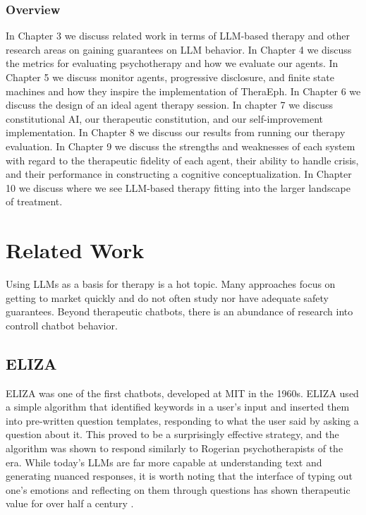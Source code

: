 \documentclass[twoside]{report}
\begin{document}
\subsection{Overview}
In Chapter 3 we discuss related work in terms of LLM-based therapy and other research areas on gaining guarantees on LLM behavior. In Chapter 4 we discuss the metrics for evaluating psychotherapy and how we evaluate our agents. In Chapter 5 we discuss monitor agents, progressive disclosure, and finite state machines and how they inspire the implementation of TheraEph. In Chapter 6 we discuss the design of an ideal agent therapy session. In chapter 7 we discuss constitutional AI, our therapeutic constitution, and our self-improvement implementation. In Chapter 8 we discuss our results from running our therapy evaluation. In Chapter 9 we discuss the strengths and weaknesses of each system with regard to the therapeutic fidelity of each agent, their ability to handle crisis, and their performance in constructing a cognitive conceptualization. In Chapter 10 we discuss where we see LLM-based therapy fitting into the larger landscape of treatment.

\chapter{Related Work}
Using LLMs as a basis for therapy is a hot topic. Many approaches focus on getting to market quickly and do not often study nor have adequate safety guarantees. Beyond therapeutic chatbots, there is an abundance of research into controll chatbot behavior.

\section{ELIZA}
ELIZA was one of the first chatbots, developed at MIT in the 1960s. ELIZA used a simple algorithm that identified keywords in a user's input and inserted them into pre-written question templates, responding to what the user said by asking a question about it. This proved to be a surprisingly effective strategy, and the algorithm was shown to respond similarly to Rogerian psychotherapists of the era. While today's LLMs are far more capable at understanding text and generating nuanced responses, it is worth noting that the interface of typing out one's emotions and reflecting on them through questions has shown therapeutic value for over half a century \cite{weizenbaum1966eliza}.
\end{document}
